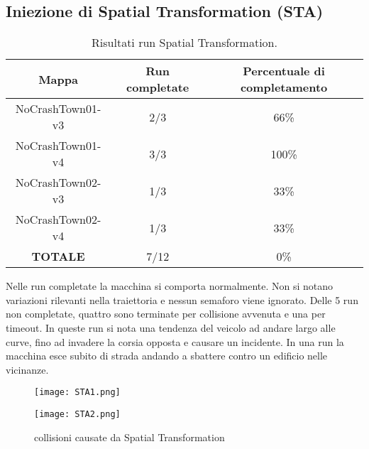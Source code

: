 \subsection{Iniezione di Spatial Transformation (STA)}
\begin{table}[h!]
    \begin{tabular}{|c|c|c|}
        \hline
        Mappa                   & Run completate & Percentuale di completamento\\
        \hline
        NoCrashTown01-v3        & 2/3            & 66\% \\
        NoCrashTown01-v4        & 3/3            & 100\% \\
        NoCrashTown02-v3        & 1/3            & 33\% \\
        NoCrashTown02-v4        & 1/3            & 33\%  \\
        \hline
        \textbf{TOTALE}                  & 7/12           & 0\% \\
        \hline
    \end{tabular}
    \caption{Risultati run Spatial Transformation.}
    \label{tab:sta}
\end{table}
Nelle run completate la macchina si comporta normalmente. Non si notano variazioni rilevanti nella traiettoria e nessun semaforo viene ignorato. Delle 5 run
non completate, quattro sono terminate per collisione avvenuta e una per timeout. In queste run si nota una tendenza del veicolo ad andare largo alle curve, fino ad invadere la corsia opposta e causare un incidente.
In una run la macchina esce subito di strada andando a sbattere contro un edificio nelle vicinanze.
\begin{figure}[h]
    \centering
    \parbox{6cm}{
    \texttt{[image: STA1.png]}
    \label{fig:sta1}}
    \qquad
    \begin{minipage}{6cm}
    \texttt{[image: STA2.png]}
    \label{fig:sta2}
    \end{minipage}
    \caption{collisioni causate da Spatial Transformation}
    \label{fig:starun}
    \end{figure}
